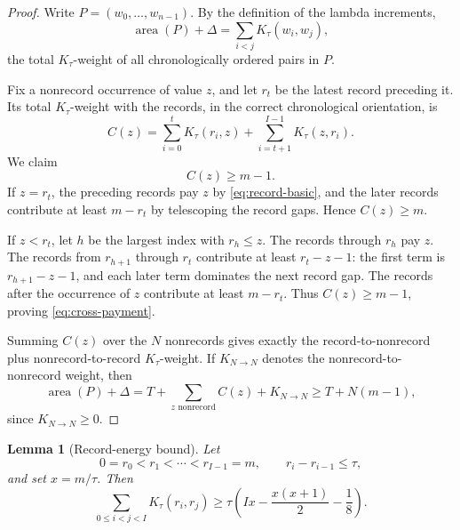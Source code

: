 \documentclass[11pt]{article}
\newtheorem{lemma}[theorem]{Lemma}
\theoremstyle{definition}
\theoremstyle{remark}
\newcommand{\area}{\operatorname{area}}
\begin{document}
\begin{proof}
Write \(P=(w_0,\ldots,w_{n-1})\).  By the definition of the lambda
increments,
\[
  \area(P)+\Delta
  =\sum_{i<j}K_\tau(w_i,w_j),
\]
the total \(K_\tau\)-weight of all chronologically ordered pairs in
\(P\).

Fix a nonrecord occurrence of value \(z\), and let \(r_t\) be the latest
record preceding it.  Its total \(K_\tau\)-weight with the records, in
the correct chronological orientation, is
\[
  C(z)=
  \sum_{i=0}^{t}K_\tau(r_i,z)
  +\sum_{i=t+1}^{I-1}K_\tau(z,r_i).
\]
We claim
\begin{equation}
  C(z)\ge m-1.
  \label{eq:cross-payment}
\end{equation}
If \(z=r_t\), the preceding records pay \(z\) by
\eqref{eq:record-basic}, and the later records contribute at least
\(m-r_t\) by telescoping the record gaps.  Hence \(C(z)\ge m\).

If \(z<r_t\), let \(h\) be the largest index with \(r_h\le z\).  The
records through \(r_h\) pay \(z\).  The records from \(r_{h+1}\) through
\(r_t\) contribute at least \(r_t-z-1\): the first term is
\(r_{h+1}-z-1\), and each later term dominates the next record gap.
The records after the occurrence of \(z\) contribute at least
\(m-r_t\).  Thus \(C(z)\ge m-1\), proving
\eqref{eq:cross-payment}.

Summing \(C(z)\) over the \(N\) nonrecords gives exactly the
record-to-nonrecord plus nonrecord-to-record \(K_\tau\)-weight.  If
\(K_{N\to N}\) denotes the nonrecord-to-nonrecord weight, then
\[
  \area(P)+\Delta
  =T+\sum_{z\text{ nonrecord}}C(z)+K_{N\to N}
  \ge T+N(m-1),
\]
since \(K_{N\to N}\ge0\).
\end{proof}

\begin{lemma}[Record-energy bound]
\label{lem:record-energy}
Let
\[
  0=r_0<r_1<\cdots<r_{I-1}=m,
  \qquad r_i-r_{i-1}\le\tau,
\]
and set \(x=m/\tau\).  Then
\begin{equation}
  \sum_{0\le i<j<I}K_\tau(r_i,r_j)
  \ge
  \tau\left(Ix-\frac{x(x+1)}2-\frac18\right).
  \label{eq:record-energy}
\end{equation}
\end{lemma}
\end{document}
